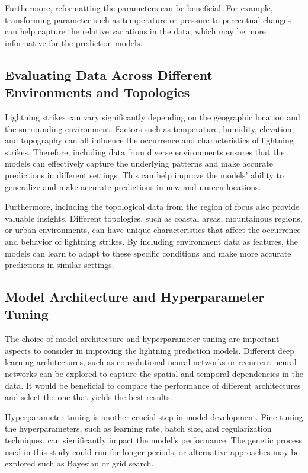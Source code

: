 Furthermore, reformatting the parameters can be beneficial. For example, transforming parameter such as temperature or pressure to percentual changes can help capture the relative variations in the data, which may be more informative for the prediction models.

\subsection{Evaluating Data Across Different Environments and Topologies}

Lightning strikes can vary significantly depending on the geographic location and the surrounding environment. Factors such as temperature, humidity, elevation, and topography can all influence the occurrence and characteristics of lightning strikes. Therefore, including data from diverse environments ensures that the models can effectively capture the underlying patterns and make accurate predictions in different settings. This can help improve the models' ability to generalize and make accurate predictions in new and unseen locations.

Furthermore, including the topological data from the region of focus also provide valuable insights. Different topologies, such as coastal areas, mountainous regions, or urban environments, can have unique characteristics that affect the occurrence and behavior of lightning strikes. By including environment data as features, the models can learn to adapt to these specific conditions and make more accurate predictions in similar settings.

\subsection{Model Architecture and Hyperparameter Tuning}

The choice of model architecture and hyperparameter tuning are important aspects to consider in improving the lightning prediction models. Different deep learning architectures, such as convolutional neural networks or recurrent neural networks can be explored to capture the spatial and temporal dependencies in the data. It would be beneficial to compare the performance of different architectures and select the one that yields the best results.

Hyperparameter tuning is another crucial step in model development. Fine-tuning the hyperparameters, such as learning rate, batch size, and regularization techniques, can significantly impact the model's performance. The genetic process used in this study could run for longer periods, or alternative approaches may be explored such as Bayesian or grid search.


